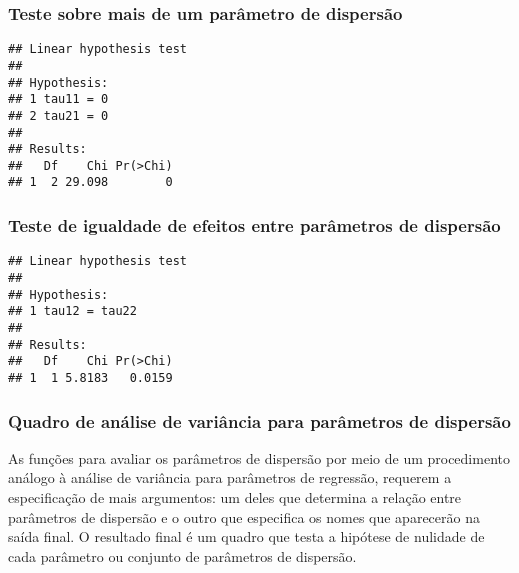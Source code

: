 \subsubsection{Teste sobre mais de um parâmetro de dispersão}

\begin{knitrout}
\color{fgcolor}\begin{kframe}
\begin{alltt}
\hlstd{(} 
                      \hlstd{=} \hlstd{(}\hlstd{,}
                                    \hlstd{))}
\end{alltt}
\begin{verbatim}
## Linear hypothesis test
## 
## Hypothesis:           
## 1 tau11 = 0
## 2 tau21 = 0
## 
## Results:
##   Df    Chi Pr(>Chi)
## 1  2 29.098        0
\end{verbatim}
\end{kframe}
\end{knitrout}

\subsubsection{Teste de igualdade de efeitos entre parâmetros de dispersão}

\begin{knitrout}
\color{fgcolor}\begin{kframe}
\begin{alltt}
\hlstd{(} 
                      \hlstd{=} \hlstd{(}\hlstd{))}
\end{alltt}
\begin{verbatim}
## Linear hypothesis test
## 
## Hypothesis:               
## 1 tau12 = tau22
## 
## Results:
##   Df    Chi Pr(>Chi)
## 1  1 5.8183   0.0159
\end{verbatim}
\end{kframe}
\end{knitrout}

\subsubsection{Quadro de análise de variância para parâmetros de dispersão}

As funções para avaliar os parâmetros de dispersão por meio de um procedimento análogo à análise de variância para parâmetros de regressão, requerem a especificação de mais argumentos: um deles que determina a relação entre parâmetros de dispersão e o outro que especifica os nomes que aparecerão na saída final. O resultado final é um quadro que testa a hipótese de nulidade de cada parâmetro ou conjunto de parâmetros de dispersão.

